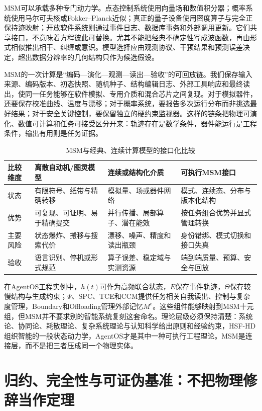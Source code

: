 MSM可以承载多种专门动力学。点态控制系统使用向量场和数值积分器；概率系统使用马尔可夫核或Fokker--Planck近似；真正的量子设备使用密度算子与完全正保持迹映射；开放软件系统则通过事件日志、数据库事务和外部调用更新。它们共享接口，不意味着方程彼此可替换。尤其不能把经典不确定性写成波函数，再由形式相似推出相干、纠缠或意识。模型选择应由观测协议、干预结果和预测误差决定，超出数据分辨率的几何结构只作为候选假设。

MSM的一次计算是“编码—演化—观测—读出—验收”的可回放链。我们保存输入来源、编码版本、初态快照、随机种子、结构编辑日志、外部工具响应和最终读出，使同一任务能够在软件模拟、专用介质和混合芯片之间复现。对于模拟器件，还要保存校准曲线、温度与漂移；对于概率系统，要报告多次运行分布而非挑选最好结果；对于安全关键控制，要保留独立的硬约束监视器。这样的链条把物理可演化、数值可计算和任务可接受区分开来：轨迹存在是数学条件，器件能运行是工程条件，输出有用则是任务证据。

\begin{table}[htbp]
\centering
\begin{tabularx}{\textwidth}{l X X X}
\toprule
\rowcolor{structurecolor!20} 比较维度 & 离散自动机/图灵模型 & 连续或结构化介质 & 可执行MSM接口 \\
\midrule
状态 & 有限符号、纸带与精确转移 & 模拟量、场或器件网络 & 模式、连续态、分布与版本化结构 \\
优势 & 可复现、可证明、易于精确提交 & 并行传播、局部算子、潜在能效 & 按任务组合优势并显式管理转换 \\
主要风险 & 状态爆炸、搬移与搜索代价 & 漂移、噪声、精度和读出瓶颈 & 身份错绑、模式切换和接口失真 \\
验收 & 语言识别、停机或形式规范 & 算子误差、稳定域与实测资源 & 端到端质量、预算、安全与回放 \\
\bottomrule
\end{tabularx}
\caption{MSM与经典、连续计算模型的接口化比较}
\label{tab:msm_vs_classical_computing}
\end{table}

在AgentOS工程实例中，$h(t)$可作为高频联合状态，$E$保存事件轨迹，$\Theta$保存较慢结构与生成约束；$\Psi$、SPC、TCE和CCM提供任务相关自我读出、控制与复杂度管理，Boundary和Offloading管理外部记忆$M^e$。这些组件能够映射到MSM十元组，但MSM并不要求别的智能系统复刻这套命名。理论层级必须保持清楚：系统论、协同论、耗散理论、复杂系统理论与认知科学给出原则和经验约束，HSF-HD组织智能的一般状态动力学，AgentOS才是其中一种可执行工程理论。MSM是连接层，而不是把三者压成同一个物理实体。

\section{归约、完全性与可证伪基准：不把物理修辞当作定理}
\label{sec:msm_reduction_and_completeness}

